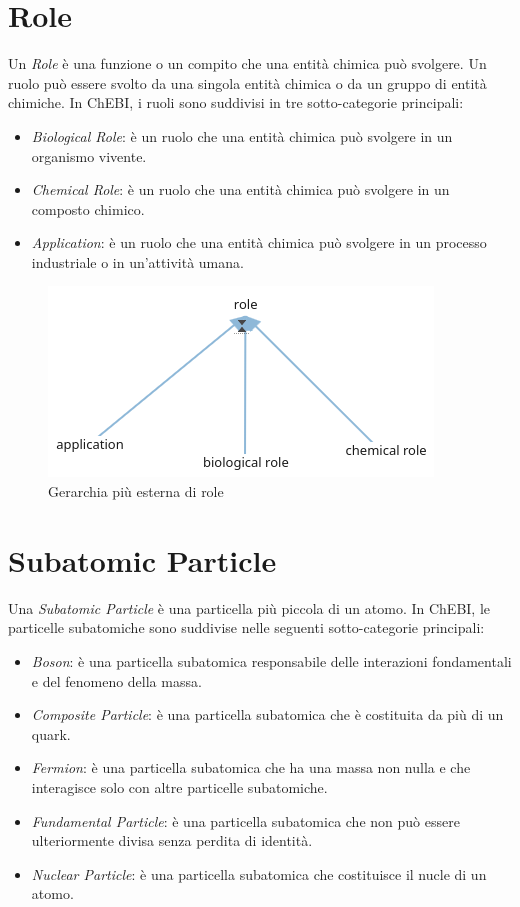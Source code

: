 \documentclass[12pt,a4paper,openright,twoside]{book}
\begin{document}
\section{Role}
Un \textit{Role} è una funzione o un compito che una entità chimica può svolgere. Un ruolo può essere svolto da una singola entità chimica o da un gruppo di entità chimiche. In ChEBI, i ruoli sono suddivisi in tre sotto-categorie principali:
\begin{itemize}
	\item \textit{Biological Role}: è un ruolo che una entità chimica può svolgere in un organismo vivente.
	\item \textit{Chemical Role}: è un ruolo che una entità chimica può svolgere in un composto chimico.
	\item \textit{Application}: è un ruolo che una entità chimica può svolgere in un processo industriale o in un'attività umana.
\end{itemize}

\begin{figure}[H]
	\centering
	\includegraphics[width=\linewidth]{figures/role.png}
	\caption{Gerarchia più esterna di role}
	\label{fig:Role}
\end{figure}

\section{Subatomic Particle}
Una \textit{Subatomic Particle} è una particella più piccola di un atomo.
In ChEBI, le particelle subatomiche sono suddivise nelle seguenti sotto-categorie principali:
\begin{itemize}
	\item \textit{Boson}: è una particella subatomica responsabile delle interazioni fondamentali e del fenomeno della massa.
	\item \textit{Composite Particle}: è una particella subatomica che è costituita da più di un quark.
	\item \textit{Fermion}: è una particella subatomica che ha una massa non nulla e che interagisce solo con altre particelle subatomiche.
	\item \textit{Fundamental Particle}: è una particella subatomica che non può essere ulteriormente divisa senza perdita di identità.
	\item \textit{Nuclear Particle}: è una particella subatomica che costituisce il nucle di un atomo.
\end{itemize}
\end{document}
